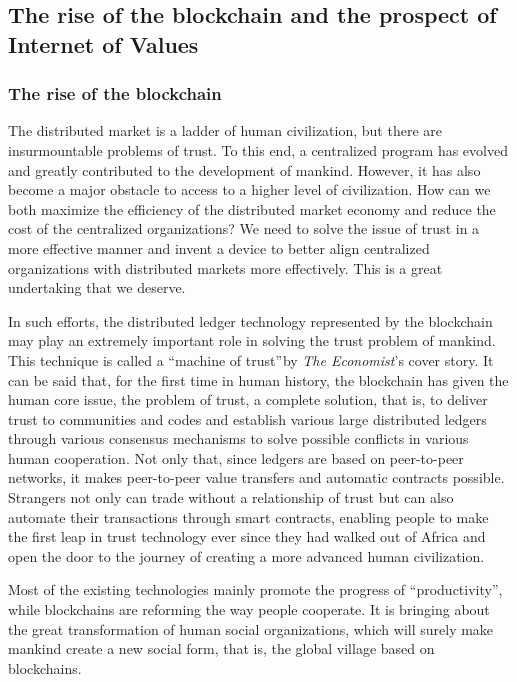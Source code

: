 \documentclass[a4paper,12pt]{article}
\begin{document}
\subsection{The rise of the blockchain and the prospect of Internet of Values}
\subsubsection{The rise of the blockchain}

The distributed market is a ladder of human civilization, but there are insurmountable problems of trust. To this end, a centralized program has evolved and greatly contributed to the development of mankind. However, it has also become a major obstacle to access to a higher level of civilization. How can we both maximize the efficiency of the distributed market economy and reduce the cost of the centralized organizations? We need to solve the issue of trust in a more effective manner and invent a device to better align centralized organizations with distributed markets more effectively. This is a great undertaking that we deserve.

In such efforts, the distributed ledger technology represented by the blockchain may play an extremely important role in solving the trust problem of mankind. This technique is called a “machine of trust” by \textit{The Economist}'s cover story. It can be said that, for the first time in human history, the blockchain has given the human core issue, the problem of trust, a complete solution, that is, to deliver trust to communities and codes and establish various large distributed ledgers through various consensus mechanisms to solve possible conflicts in various human cooperation. Not only that, since ledgers are based on peer-to-peer networks, it makes peer-to-peer value transfers and automatic contracts possible. Strangers not only can trade without a relationship of trust but can also automate their transactions through smart contracts, enabling people to make the first leap in trust technology ever since they had walked out of Africa and open the door to the journey of creating a more advanced human civilization.

Most of the existing technologies mainly promote the progress of “productivity”, while blockchains are reforming the way people cooperate. It is bringing about the great transformation of human social organizations, which will surely make mankind create a new social form, that is, the global village based on blockchains.
\end{document}
